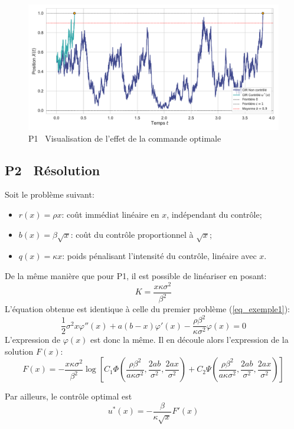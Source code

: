 \begin{figure}[htb]
    \centering
    \includegraphics[width=0.9\linewidth]{img/validation/P1/p1_control_simulation.pdf}
    \caption{P1 \textemdash~Visualisation de l'effet de la commande optimale}\label{fig:Simulation1}
\end{figure}\FloatBarrier\subsection{P2 \textemdash~Résolution}\label{p2}
\noindent Soit le problème suivant: 
\begin{itemize}
    \item $r(x) = \rho x$: coût immédiat linéaire en $x$, indépendant du contrôle;
    \item $b(x) = \beta \sqrt{x}$: coût du contrôle proportionnel à $\sqrt{x}$;
    \item $q(x) = \kappa x$: poids pénalisant l'intensité du contrôle, linéaire avec $x$.
\end{itemize}
De la même manière que pour P1, il est possible de linéariser en posant: 
\[
K=\frac{x\kappa \sigma^2}{\beta^2}
\]
L'équation obtenue est identique à celle du premier problème (\ref{eq_exemple1}): 
\[
\frac{1}{2}\sigma^2 x\varphi''(x) + a(b - x)\varphi'(x) - \frac{\rho\beta^2}{\kappa \sigma^2}\varphi(x) = 0
\]
L'expression de $\varphi(x)$ est donc la même. Il en découle alors l'expression de la solution $F(x)$: 
\begin{equation}\label{sol_control_2}
    F(x)=-\frac{x\kappa \sigma^2}{\beta^2}\log\left[C_1\Phi\left(\frac{\rho\beta^2}{a\kappa \sigma^2},\frac{2ab}{\sigma^2},\frac{2ax}{\sigma^2}\right) + C_2\Psi\left(\frac{\rho\beta^2}{a\kappa \sigma^2},\frac{2ab}{\sigma^2},\frac{2ax}{\sigma^2}\right)\right]
\end{equation}

Par ailleurs, le contrôle optimal est
\begin{equation}\label{optimal_control_2}
    u^*(x)=-\frac{\beta}{\kappa\sqrt{x}}F'(x)
\end{equation}
